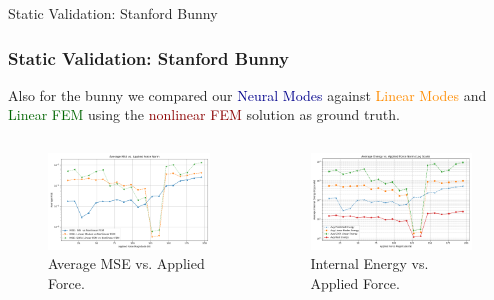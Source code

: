 \documentclass{beamer}
\begin{document}
\begin{frame}{Static Validation: Stanford Bunny}
    \frametitle{Static Validation: Stanford Bunny}
    
Also for the bunny we compared our \textcolor{darkblue}{Neural Modes} against \textcolor{darkorange}{Linear Modes} and \textcolor{darkgreen}{Linear FEM} using the \textcolor{darkred}{nonlinear FEM} solution as ground truth.    
    \begin{columns}[T]
        \begin{column}{0.5\textwidth}

            \begin{figure}
                \includegraphics[width=\textwidth]{Images/bunny_static_mse.png}
                \caption{Average MSE vs. Applied Force.}
            \end{figure}
        \end{column}
        
        \begin{column}{0.5\textwidth}
            \begin{figure}
                \includegraphics[width=\textwidth]{Images/bunny_static_energy.png}
                \caption{Internal Energy vs. Applied Force.}
            \end{figure}
        \end{column}
    \end{columns}
\end{frame}
\end{document}
